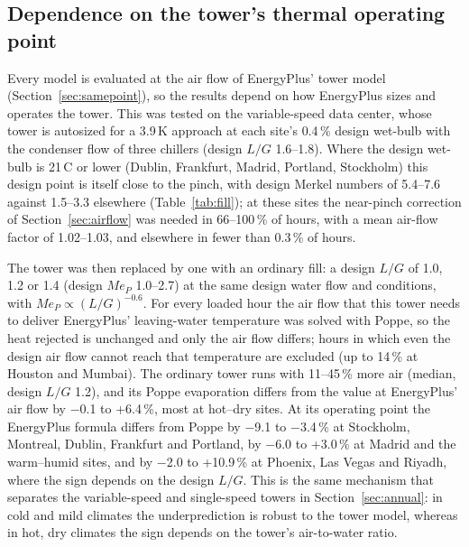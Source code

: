 \documentclass[preprint,12pt]{elsarticle}
\begin{document}
\subsection{Dependence on the tower's thermal operating point}\label{sec:consistency}
Every model is evaluated at the air flow of EnergyPlus' tower model (Section~\ref{sec:samepoint}), so the results depend
on how EnergyPlus sizes and operates the tower. This was tested on the variable-speed data center, whose tower is
autosized for a 3.9\,K approach at each site's 0.4\,\% design wet-bulb with the condenser flow of three chillers (design
$L/G$ 1.6--1.8). Where the design wet-bulb is 21\,\textdegree C or lower (Dublin, Frankfurt, Madrid, Portland, Stockholm)
this design point is itself close to the pinch, with design Merkel numbers of 5.4--7.6 against 1.5--3.3 elsewhere
(Table~\ref{tab:fill}); at these sites the near-pinch correction of Section~\ref{sec:airflow} was needed in 66--100\,\% of
hours, with a mean air-flow factor of 1.02--1.03, and elsewhere in fewer than 0.3\,\% of hours.

The tower was then replaced by one with an ordinary fill: a design $L/G$ of 1.0, 1.2 or 1.4 (design $Me_P$ 1.0--2.7) at the
same design water flow and conditions, with $Me_P\propto(L/G)^{-0.6}$. For every loaded hour the air flow that this tower
needs to deliver EnergyPlus' leaving-water temperature was solved with Poppe, so the heat rejected is unchanged and only
the air flow differs; hours in which even the design air flow cannot reach that temperature are excluded (up to 14\,\% at
Houston and Mumbai). The ordinary tower runs with 11--45\,\% more air (median, design $L/G$ 1.2), and its Poppe evaporation
differs from the value at EnergyPlus' air flow by $-$0.1 to +6.4\,\%, most at hot--dry sites. At its operating point the
EnergyPlus formula differs from Poppe by $-$9.1 to $-$3.4\,\% at Stockholm, Montreal, Dublin, Frankfurt and Portland, by
$-$6.0 to +3.0\,\% at Madrid and the warm--humid sites, and by $-$2.0 to +10.9\,\% at Phoenix, Las Vegas and Riyadh, where the
sign depends on the design $L/G$. This is the same mechanism that separates the variable-speed and single-speed towers in
Section~\ref{sec:annual}: in cold and mild climates the underprediction is robust to the tower model, whereas in hot, dry
climates the sign depends on the tower's air-to-water ratio.

\begin{table}[t]\centering\scriptsize
\caption{Variable-speed data center: design point of the EnergyPlus tower and the ordinary-fill check (sites sorted by
mean wet-bulb). $T_{wb,d}$: design wet-bulb; $Me_{P,d}$: Poppe Merkel number at the design point; corr.: share of loaded
hours with the near-pinch air-flow correction; EP vs P: EnergyPlus saturated exit vs Poppe annual evaporation. Ordinary
fill: design $L/G$ = 1.2, and range over design $L/G$ = 1.0--1.4; P shift: Poppe evaporation with the ordinary fill vs
EnergyPlus' air flow; capped: hours excluded because the ordinary tower cannot reach EnergyPlus' leaving-water
temperature.}\label{tab:fill}
\resizebox{\linewidth}{!}{}
\end{table}
\end{document}

